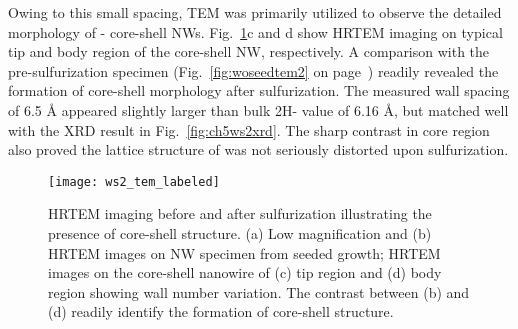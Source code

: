 Owing to this small spacing, TEM was primarily utilized to observe the detailed morphology of - core-shell NWs. Fig.~\ref{fig:ch5ws2tem1}c and d show HRTEM imaging on typical tip and body region of the core-shell NW, respectively. A comparison with the pre-sulfurization specimen (Fig.~\ref{fig:woseedtem2} on page~\pageref{fig:woseedtem2}) readily revealed the formation of core-shell morphology after sulfurization. The measured wall spacing of 6.5 \si{\angstrom} appeared slightly larger than bulk 2H- value of 6.16 \si{\angstrom}, but matched well with the XRD result in Fig.~\ref{fig:ch5ws2xrd}. The sharp contrast in core region also proved the lattice structure of  was not seriously distorted upon sulfurization.
\begin{figure}[htb]
\centering
\texttt{[image: ws2\_tem\_labeled]}
\caption[HRTEM imaging before and after sulfurization]{HRTEM imaging before and after sulfurization illustrating the presence of core-shell structure. (a) Low magnification and (b) HRTEM images on  NW specimen from seeded growth;  HRTEM images on the core-shell nanowire of (c) tip region and (d) body region showing wall number variation. The contrast between (b) and (d) readily identify the formation of core-shell structure. }
\label{fig:ch5ws2tem1}
\end{figure}

